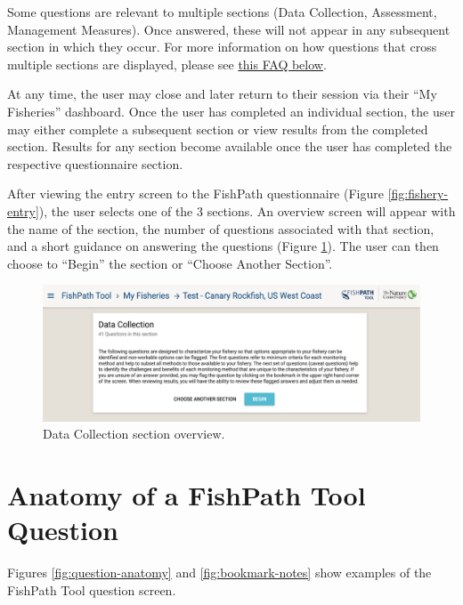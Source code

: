 \documentclass[
  11pt,
]{book}
\begin{document}
Some questions are relevant to multiple sections (Data Collection, Assessment, Management Measures). Once answered, these will not appear in any subsequent section in which they occur. For more information on how questions that cross multiple sections are displayed, please see \protect\hyperlink{faq-question-numbering}{this FAQ below}.

At any time, the user may close and later return to their session via their ``My Fisheries'' dashboard. Once the user has completed an individual section, the user may either complete a subsequent section or view results from the completed section. Results for any section become available once the user has completed the respective questionnaire section.

After viewing the entry screen to the FishPath questionnaire (Figure \ref{fig:fishery-entry}), the user selects one of the 3 sections. An overview screen will appear with the name of the section, the number of questions associated with that section, and a short guidance on answering the questions (Figure \ref{fig:dc-overview}). The user can then choose to ``Begin'' the section or ``Choose Another Section''.

\begin{figure}

{\centering \includegraphics[width=0.95\linewidth]{images/dc-overview} 

}

\caption{Data Collection section overview.}\label{fig:dc-overview}
\end{figure}

\hypertarget{anatomy-of-a-fishpath-tool-question}{%
\section{Anatomy of a FishPath Tool Question}\label{anatomy-of-a-fishpath-tool-question}}

Figures \ref{fig:question-anatomy} and \ref{fig:bookmark-notes} show examples of the FishPath Tool question screen.
\end{document}
